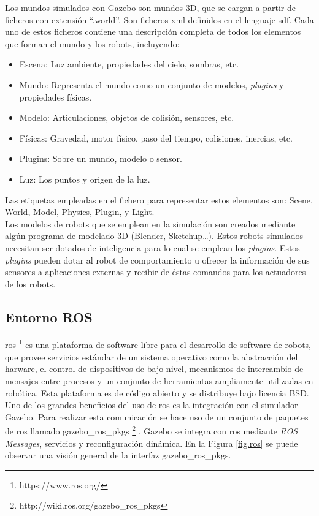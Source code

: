 Los mundos simulados con Gazebo son mundos 3D, que se cargan a partir de ficheros con extensión ``.world''. Son ficheros \acrfull{xml} definidos en el lenguaje \acrfull{sdf}. Cada uno de estos ficheros contiene una descripción completa de todos los elementos que forman el mundo y los robots, incluyendo:


\begin{itemize}
\item Escena: Luz ambiente, propiedades del cielo, sombras, etc.
\item Mundo: Representa el mundo como un conjunto de modelos, \textit{plugins} y propiedades físicas.
\item Modelo: Articulaciones, objetos de colisión, sensores, etc.
\item Físicas: Gravedad, motor físico, paso del tiempo, colisiones, inercias, etc.
\item Plugins: Sobre un mundo, modelo o sensor.
\item Luz: Los puntos y origen de la luz.
\end{itemize}

Las etiquetas empleadas en el fichero para representar estos elementos son: Scene, World, Model, Physics, Plugin, y Light.\\

Los modelos de robots que se emplean en la simulación son creados mediante algún programa de modelado 3D (Blender, Sketchup…). Estos robots simulados necesitan ser dotados de inteligencia para lo cual se emplean los \textit{plugins}. Estos \textit{plugins} pueden dotar al robot de comportamiento u ofrecer la información de sus sensores a aplicaciones externas y recibir de éstas comandos para los actuadores de los robots.

\subsection{Entorno ROS}

\acrfull{ros} \footnote{https://www.ros.org/} \cite{middleware1} es una plataforma de software libre para el desarrollo de software de robots, que provee servicios estándar de un sistema operativo como la abstracción del harware, el control de dispositivos de bajo nivel, mecanismos de intercambio de mensajes entre procesos y un conjunto de herramientas ampliamente utilizadas en robótica. Esta plataforma es de código abierto y se distribuye bajo licencia BSD.\\

Uno de los grandes beneficios del uso de \acrshort{ros} es la integración con el simulador Gazebo. Para realizar esta comunicación se hace uso de un conjunto de paquetes de \acrshort{ros} llamado gazebo\_ros\_pkgs \footnote{http://wiki.ros.org/gazebo\_ros\_pkgs} \cite{ros_integration}. Gazebo se integra con \acrshort{ros} mediante \textit{ROS Messages}, servicios y reconfiguración dinámica. En la Figura \ref{fig.ros} se puede observar una visión general de la interfaz gazebo\_ros\_pkgs.\\

